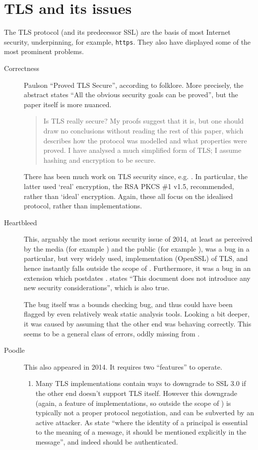 \documentclass{llncs}
\begin{document}
\section{TLS and its issues}
The TLS protocol (and its predecessor SSL) are the basis of most Internet security, underpinning, for example, \verb+https+. They also have displayed some of the most prominent problems.
\begin{description}
\item[Correctness]Paulson \cite{Paulson1999} ``Proved TLS Secure'', according to folklore. More precisely, the abstract states ``All the
obvious security goals can be proved'', but the paper itself is more nuanced.
\begin{quote}
Is TLS really secure? My proofs suggest that it is, but one should draw no conclusions without reading the rest of this paper, which describes how the protocol
was modelled and what properties were proved. I have analysed a much simplified
form of TLS; I assume hashing and encryption to be secure.
\end{quote}
There has been much work on TLS security since, e.g. \cite{Heetal2005,Krawczyketal2013a}. In particular, the latter used `real' encryption, the RSA PKCS \#1 v1.5, recommended, rather than `ideal' encryption. Again, these all focus on the idealised protocol, rather than implementations.
\item[Heartbleed \cite{NIST2014a}]This, arguably the most serious security issue of 2014, at least as perceived by the media (for example \cite{BBC2014b}) and the public (for example \cite{Steinberg2014a}), was a bug in a particular, but very widely used, implementation (OpenSSL) of TLS, and hence instantly falls outside the scope of \cite{Paulson1999}. Furthermore, it was a bug in an extension \cite{Seggelmannetal2012a} which postdates \cite{Paulson1999}.  \cite{Seggelmannetal2012a} states ``This document does not introduce any new security    considerations'', which is also true.
\par
The bug itself was a bounds checking bug, and thus could have been flagged by even relatively weak static analysis tools.  Looking a bit deeper, it was caused by assuming that the other end was behaving correctly. This seems to be a general class of errors, oddly missing from \cite{AndersonNeedham1995}.
\item[Poodle \cite{Molleretal2014a,NIST2014b}]This also appeared in 2014. It requires two ``features'' to operate.
\begin{enumerate}
\item Many TLS implementations contain ways to downgrade to SSL 3.0 if the other end doesn't support TLS itself. However this downgrade (again, a feature of implementations, so outside the scope of \cite{Paulson1999}) is typically not a proper protocol negotiation, and can be subverted by an active attacker. As \cite{AndersonNeedham1995} state ``where the identity of a principal is essential to the meaning of a message, it should be mentioned explicitly in the message'', and indeed should be authenticated.

\end{enumerate}
\end{description}
\end{document}
